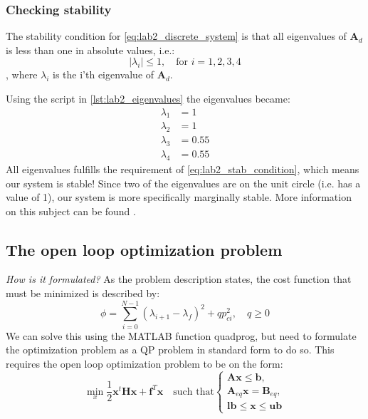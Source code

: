 \documentclass[../main.tex]{subfiles}
\begin{document}
\subsubsection{Checking stability}
The stability condition for \cref{eq:lab2_discrete_system} is that all eigenvalues of $ \bm A_d $ is less than one in absolute values, i.e.:
\begin{equation}\label{eq:lab2_stab_condition}
	|\lambda_i| \leq 1, \quad \text{for } i = 1, 2, 3, 4
\end{equation}, where $ \lambda_i $ is the i'th eigenvalue of $ \bm A_d $.

Using the script in \cref{lst:lab2_eigenvalues} the eigenvalues became:
\begin{subequations}\label{eq:lab2_eigenvalues}
	\begin{align}
		\lambda_1 &= 1 \\
		\lambda_2 &= 1 \\
		\lambda_3 &= 0.55 \\
		\lambda_4 &= 0.55
	\end{align}
\end{subequations}
All eigenvalues fulfills the requirement of \cref{eq:lab2_stab_condition}, which means our system is stable! Since two of the eigenvalues are on the unit circle (i.e. has a value of 1), our system is more specifically marginally stable. More information on this subject can be found .



\subsection{The open loop optimization problem}
\textit{How is it formulated?}
As the problem description states, the cost function that must be minimized is described by:
\begin{equation} \label{eq:lab2_start_cost_func}
	\phi = \sum_{i=0}^{N-1} \left( \lambda_{i+1} - \lambda_f \right)^2 + qp_{ci}^2 , \quad q \ge 0
\end{equation}
We can solve this using the MATLAB function quadprog, but need to formulate the optimization problem as a QP problem in standard form to do so. This requires the open loop optimization problem to be on the form: 
\begin{equation}\label{eq:lab2_quadprog_std_form}
	\min_x \frac{1}{2} \bm x^t \bm H \bm x + \bm f^T \bm x \quad \text{such that} \begin{cases}
		\bm A \bm x \leq \bm b, \\
		\bm A_{eq} \bm x = \bm B_{eq}, \\
		\bm{lb} \leq \bm x \leq \bm{ub}		
	\end{cases}
\end{equation}
\end{document}
